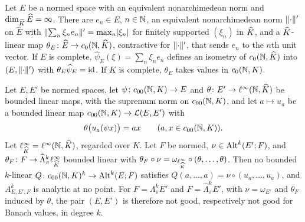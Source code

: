 \begin{lemma}[marking]\label{fib:lem:marking}
Let $E$ be a normed space with an equivalent nonarchimedean norm and $\dim_{\widehat K}\widehat E=\infty$. There are
$e_n\in E$, $n\in\mathbb N$, an equivalent nonarchimedean norm $\lVert \cdot\rVert'$ on $\widehat E$ with
$\lVert \sum_n\xi_ne_n\rVert'=\max_n\lvert \xi_n\rvert$ for finitely supported $(\xi_n)$ in $\widehat K$, and a $\widehat K$\nobreakdash-linear map
$\theta_E\colon\widehat E\to c_0(\mathbb N,\widehat K)$, contractive for $\lVert \cdot\rVert'$, that sends $e_n$ to the $n$th unit vector. If
$E$ is complete, $\widehat\psi_E(\xi)=\sum_n\xi_ne_n$ defines an isometry of $c_0(\mathbb N,\widehat K)$ into $(E,\lVert \cdot\rVert')$ with
$\theta_E\widehat\psi_E=\mathrm{id}$. If $K$ is complete, $\theta_E$ takes values in $c_0(\mathbb N,K)$.
\end{lemma}

\begin{theorem}\label{fib:thm:marking}
Let $E,E'$ be normed spaces, let $\psi\colon c_{00}(\mathbb N,K)\to E$ and $\theta\colon E'\to\ell^\infty(\mathbb N,\widehat K)$ be bounded
linear maps, with the supremum norm on $c_{00}(\mathbb N,K)$, and let $a\mapsto u_a$ be a bounded linear map
$c_{00}(\mathbb N,K)\to\mathcal L(E,E')$ with
\begin{equation}\label{fib:eq:marking}
 \theta\bigl(u_a(\psi x)\bigr)=ax\qquad(a,x\in c_{00}(\mathbb N,K)).
\end{equation}
Let $\ell^\infty_{\widehat K}=\ell^\infty(\mathbb N,\widehat K)$, regarded over $K$. Let $F$ be normed, $\nu\in\operatorname{Alt}^k(E';F)$, and
$\theta_F\colon F\to\widehat\Lambda^k_\pi\ell^\infty_{\widehat K}$ bounded linear with
$\theta_F\circ\nu=\omega_{\ell^\infty_{\widehat K}}\circ(\theta,\dots,\theta)$.
Then no bounded $k$\nobreakdash-linear $Q\colon c_{00}(\mathbb N,K)^k\to\operatorname{Alt}^k(E;F)$ satisfies $Q(a,\dots,a)=\nu\circ(u_a,\dots,u_a)$,
and $A^k_{E,E';F}$ is analytic at no point. For $F=\Lambda^k_\pi E'$ and $F=\widehat\Lambda^k_\pi E'$, with
$\nu=\omega_{E'}$ and $\theta_F$ induced by $\theta$, the pair $(E,E')$ is therefore not good, respectively not good for
Banach values, in degree $k$.
\end{theorem}

